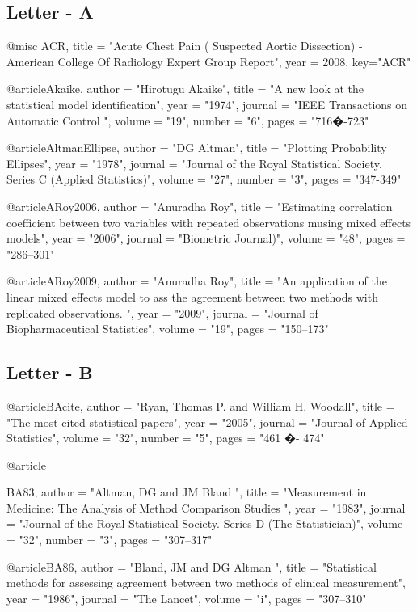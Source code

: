 

\subsection*{Letter - A}

@misc {ACR,
	title = "Acute {C}hest {P}ain ( Suspected Aortic Dissection) - {A}merican {C}ollege Of {R}adiology {E}xpert {G}roup {R}eport",
	year = 2008,
	key="ACR"
}


@article{Akaike,	
	author = "Hirotugu Akaike",
	title = "A new look at the statistical model identification",
	year = "1974",
	journal = "IEEE Transactions on Automatic Control ",
	volume = "19",
	number = "6",
	pages = "716�-723"
}

@article{AltmanEllipse,
	author = "DG Altman",
	title = "Plotting Probability Ellipses",
	year = "1978",
	journal = "Journal of the Royal Statistical Society. Series C (Applied Statistics)",
	volume = "27",
	number = "3",
	pages = "347-349"
}


@article{ARoy2006,
	author = "Anuradha Roy",
	title = "Estimating correlation coefficient between two variables with repeated observations musing mixed effects models",
	year = "2006",
	journal = "Biometric Journal)",
	volume = "48",
	pages = "286--301"
}

@article{ARoy2009,
	author = "Anuradha Roy",
	title = "An application of the linear mixed effects model to ass the agreement between two methods with replicated observations. ",
	year = "2009",
	journal = "Journal of Biopharmaceutical Statistics",
	volume = "19",
	pages = "150--173"
}

\subsection*{Letter - B}

@article{BAcite,
	author = "Ryan, Thomas P. and  William H. Woodall",
	title = "The most-cited statistical papers",
	year = "2005",
	journal = "Journal of Applied Statistics",
	volume = "32",
	number = "5",
	pages = "461 �- 474"
}

@article{BA83,
	author = "Altman, DG and JM Bland ",
	title = "Measurement in Medicine: The Analysis of Method Comparison Studies ",
	year = "1983",
	journal = "Journal of the Royal Statistical Society. Series D (The Statistician)",
	volume = "32",
	number = "3",
	pages = "307--317"
	
}

@article{BA86,
	author = "Bland, JM and DG Altman ",
	title = "Statistical methods for assessing agreement between two methods of clinical measurement",
	year = "1986",
	journal = "The Lancet",
	volume = "i",	
	pages = "307--310"
}


